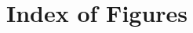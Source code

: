 \documentclass[a4paper,12pt]{article}
\begin{document}

\tableofcontents

\pagebreak


\section*{Index of Figures}

\pagebreak

\end{document}
